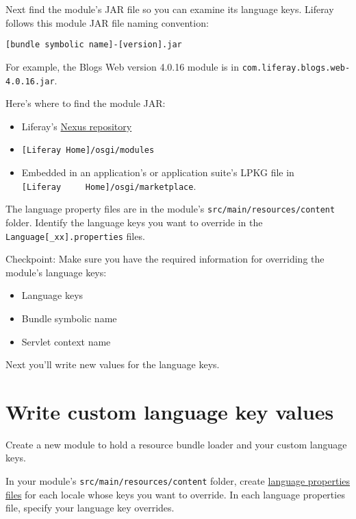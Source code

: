 Next find the module's JAR file so you can examine its language keys.
Liferay follows this module JAR file naming convention:

\begin{verbatim}
[bundle symbolic name]-[version].jar
\end{verbatim}

For example, the Blogs Web version 4.0.16 module is in
\texttt{com.liferay.blogs.web-4.0.16.jar}.

Here's where to find the module JAR:

\begin{itemize}
\tightlist
\item
  Liferay's
  \href{https://repository.liferay.com/nexus/content/repositories/liferay-public-releases/com/liferay/}{Nexus
  repository}
\item
  \texttt{{[}Liferay\ Home{]}/osgi/modules}
\item
  Embedded in an application's or application suite's LPKG file in
  \texttt{{[}Liferay\ \ \ \ \ Home{]}/osgi/marketplace}.
\end{itemize}

The language property files are in the module's
\texttt{src/main/resources/content} folder. Identify the language keys
you want to override in the \texttt{Language{[}\_xx{]}.properties}
files.

Checkpoint: Make sure you have the required information for overriding
the module's language keys:

\begin{itemize}
\tightlist
\item
  Language keys
\item
  Bundle symbolic name
\item
  Servlet context name
\end{itemize}

Next you'll write new values for the language keys.

\section{Write custom language key
values}\label{write-custom-language-key-values}

Create a new module to hold a resource bundle loader and your custom
language keys.

In your module's \texttt{src/main/resources/content} folder, create
\href{/docs/7-2/frameworks/-/knowledge_base/f/localizing-your-application}{language
properties files} for each locale whose keys you want to override. In
each language properties file, specify your language key overrides.

